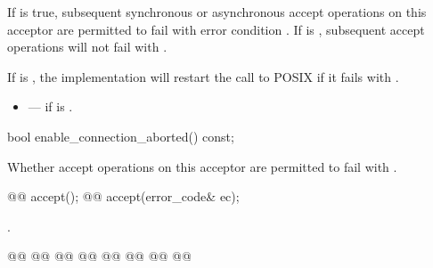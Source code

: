 \begin{itemdescr}
\pnum
\effects If  is true, subsequent synchronous or asynchronous accept operations on this acceptor are permitted to fail with error condition . If  is , subsequent accept operations will not fail with . \begin{note} If  is , the implementation will restart the call to POSIX  if it fails with . \end{note}

\pnum
\errors
\begin{itemize}
\item
{} --- if  is .
\end{itemize}
\end{itemdescr}

\begin{itemdecl}
bool enable_connection_aborted() const;
\end{itemdecl}

\begin{itemdescr}
\pnum
\returns Whether accept operations on this acceptor are permitted to fail with .
\end{itemdescr}

\begin{itemdecl}
@@ accept();
@@ accept(error_code& ec);
\end{itemdecl}

\begin{itemdescr}
\pnum
\returns {}.
\end{itemdescr}

\begin{itemdecl}
@@
@@
@@
@@
@@
@@
@@
@@
\end{itemdecl}

